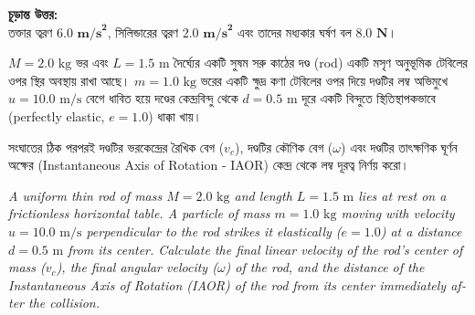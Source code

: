 \documentclass[12pt, a4paper]{article}
\begin{document}
\begin{tcolorbox}[solutionbox={সমাধান (Solution)}]
\vspace{1em}
\begin{tcolorbox}[answerbox]
\textbf{চূড়ান্ত উত্তর:} \\
তক্তার ত্বরণ $\mathbf{6.0\text{ m/s}^2}$, সিলিন্ডারের ত্বরণ $\mathbf{2.0\text{ m/s}^2}$ এবং তাদের মধ্যকার ঘর্ষণ বল $\mathbf{8.0\text{ N}}$।
\end{tcolorbox}
\end{tcolorbox}

\begin{tcolorbox}[questionbox={প্রশ্ন (Question)14}]
\noindent
$M = 2.0\text{ kg}$ ভর এবং $L = 1.5\text{ m}$ দৈর্ঘ্যের একটি সুষম সরু কাঠের দণ্ড (rod) একটি মসৃণ অনুভূমিক টেবিলের ওপর স্থির অবস্থায় রাখা আছে। $m = 1.0\text{ kg}$ ভরের একটি ক্ষুদ্র কণা টেবিলের ওপর দিয়ে দণ্ডটির লম্ব অভিমুখে $u = 10.0\text{ m/s}$ বেগে ধাবিত হয়ে দণ্ডের কেন্দ্রবিন্দু থেকে $d = 0.5\text{ m}$ দূরে একটি বিন্দুতে স্থিতিস্থাপকভাবে (perfectly elastic, $e = 1.0$) ধাক্কা খায়। 

\vspace{0.3em}
\noindent
সংঘাতের ঠিক পরপরই দণ্ডটির ভরকেন্দ্রের রৈখিক বেগ ($v_c$), দণ্ডটির কৌণিক বেগ ($\omega$) এবং দণ্ডটির তাৎক্ষণিক ঘূর্ণন অক্ষের (Instantaneous Axis of Rotation - IAOR) কেন্দ্র থেকে লম্ব দূরত্ব নির্ণয় করো।

\vspace{0.8em}
\begin{english}
\noindent\textit{\color{darkgray}
A uniform thin rod of mass $M = 2.0\text{ kg}$ and length $L = 1.5\text{ m}$ lies at rest on a frictionless horizontal table. A particle of mass $m = 1.0\text{ kg}$ moving with velocity $u = 10.0\text{ m/s}$ perpendicular to the rod strikes it elastically ($e = 1.0$) at a distance $d = 0.5\text{ m}$ from its center. Calculate the final linear velocity of the rod's center of mass ($v_c$), the final angular velocity ($\omega$) of the rod, and the distance of the Instantaneous Axis of Rotation (IAOR) of the rod from its center immediately after the collision.
}
\end{english}
\end{tcolorbox}
\end{document}
